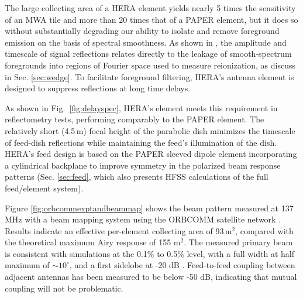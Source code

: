 \documentclass[preprint,11pt]{aastex}
\newcommand{\Mycitet}[1]{\citet{#1}}
\newcommand{\Mycitep}[1]{\citep{#1}}
\begin{document}
The large collecting area of a HERA element yields nearly 5 times the sensitivity of an MWA tile and more
than 20 times that of a PAPER element, but it does so without substantially
degrading our ability to isolate and remove foreground emission on the basis of
spectral smoothness.  As shown in
\Mycitet{parsons_et_al2012b}, the amplitude and timescale of signal reflections
relates directly to the leakage of smooth-spectrum foregrounds into regions of Fourier space 
used to measure reionization, as discuss in Sec. \ref{sec:wedge}.
To facilitate foreground filtering, HERA's antenna element is designed to suppress reflections at long time delays.


As shown in Fig.~\ref{fig:delayspec}, HERA's element meets this requirement in
reflectometry tests, performing comparably to the PAPER element.  The
relatively short (4.5\,m) focal height of the parabolic dish 
minimizes the timescale of feed-dish reflections while maintaining the feed's
illumination of the dish.  HERA's feed design is based on the PAPER sleeved
dipole element incorporating a cylindrical backplane to
improve symmetry in the polarized beam response patterns (Sec. \ref{sec:feed}, which also presents HFSS calculations of the full feed/element system).


Figure \ref{fig:orbcommexptandbeammap} shows the beam pattern measured at 137 MHz with a beam mapping
system using the ORBCOMM satellite network \Mycitep{neben_et_al2016}.  Results
indicate an effective per-element collecting area of 93\,m$^2$, compared with the
theoretical maximum Airy response of 155 m$^2$.  The measured primary beam is
consistent with simulations at the 0.1\% to 0.5\% level, with a full width at
half maximum of $\sim$$10^\circ$, and a first sidelobe at -20 dB \citep{ewallwice_et_al2016,neben_et_al2016,patra_et_al2016,thyagarajan_et_al2016}.
Feed-to-feed coupling between adjacent antennas has been measured to be below -50 dB, indicating
that mutual coupling will not be problematic.
\end{document}
